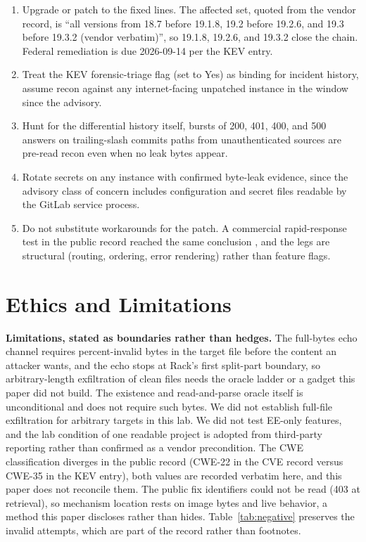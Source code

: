 \documentclass[journal]{IEEEtran}
\begin{document}
\begin{enumerate}
\item Upgrade or patch to the fixed lines. The affected set, quoted from the
vendor record, is ``all versions from 18.7 before 19.1.8, 19.2 before 19.2.6, and 19.3 before 19.3.2 (vendor verbatim)'',
so 19.1.8, 19.2.6, and 19.3.2 close the chain. Federal remediation is due
2026-09-14 per the KEV entry.
\item Treat the KEV forensic-triage flag (set to Yes) as binding for incident
history, assume recon against any internet-facing unpatched instance in the
window since the advisory.
\item Hunt for the differential history itself, bursts of 200, 401, 400, and
500 answers on trailing-slash commits paths from unauthenticated sources are
pre-read recon even when no leak bytes appear.
\item Rotate secrets on any instance with confirmed byte-leak evidence, since
the advisory class of concern includes configuration and secret files
readable by the GitLab service process.
\item Do not substitute workarounds for the patch. A commercial rapid-response
test in the public record reached the same conclusion \cite{h3}, and the legs
are
structural (routing, ordering, error rendering) rather than feature flags.
\end{enumerate}

\section{Ethics and Limitations}
\label{sec:limits}

\textbf{Limitations, stated as boundaries rather than hedges.} The
full-bytes echo channel requires percent-invalid bytes in the target file
before the content an attacker wants, and the echo stops at Rack's first
split-part boundary, so arbitrary-length exfiltration of clean files needs the
oracle ladder or a gadget this paper did not build. The existence and
read-and-parse oracle itself is unconditional and does not require such bytes.
We did not establish full-file exfiltration for arbitrary targets in this
lab. We did not test EE-only features, and the lab condition of one readable
project is adopted from third-party reporting rather than confirmed as a
vendor precondition. The CWE classification diverges in the public record
(CWE-22 in the CVE record versus CWE-35 in the KEV entry), both values are
recorded verbatim here, and this paper does not reconcile them. The public fix
identifiers could not be read (403 at retrieval), so mechanism location rests
on image bytes and live behavior, a method this paper discloses rather than
hides. Table~\ref{tab:negative} preserves the invalid attempts, which are part
of the record rather than footnotes.
\end{document}
